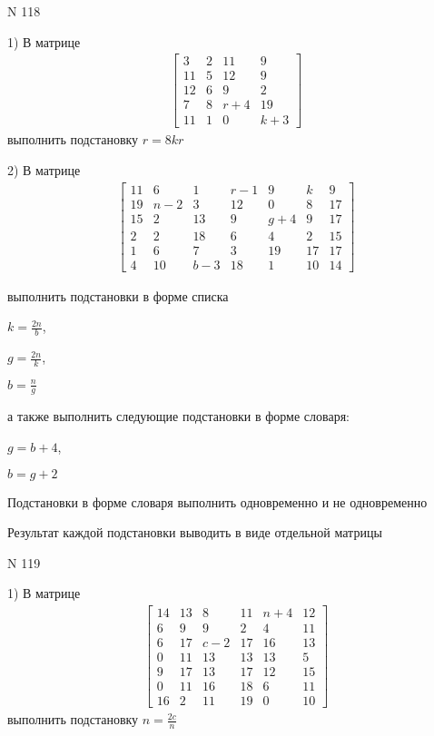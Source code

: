 \documentclass[11pt]{report}
\begin{document}
\newpage
N 118


    1) В матрице
\begin{align*}
\left[\begin{matrix}3 & 2 & 11 & 9\\11 & 5 & 12 & 9\\12 & 6 & 9 & 2\\7 & 8 & r + 4 & 19\\11 & 1 & 0 & k + 3\end{matrix}\right]
\end{align*}
выполнить подстановку $r=8 k r$


    2) В матрице
\begin{align*}
\left[\begin{matrix}11 & 6 & 1 & r - 1 & 9 & k & 9\\19 & n - 2 & 3 & 12 & 0 & 8 & 17\\15 & 2 & 13 & 9 & g + 4 & 9 & 17\\2 & 2 & 18 & 6 & 4 & 2 & 15\\1 & 6 & 7 & 3 & 19 & 17 & 17\\4 & 10 & b - 3 & 18 & 1 & 10 & 14\end{matrix}\right]
\end{align*}

выполнить подстановки в форме списка

$k=\frac{2 n}{b}$,

$g=\frac{2 n}{k}$,

$b=\frac{n}{g}$

а также выполнить следующие подстановки в форме словаря:

$g=b + 4$,

$b=g + 2$


    Подстановки в форме словаря выполнить одновременно и не одновременно


    Результат каждой подстановки выводить в виде отдельной матрицы

\newpage
N 119


    1) В матрице
\begin{align*}
\left[\begin{matrix}14 & 13 & 8 & 11 & n + 4 & 12\\6 & 9 & 9 & 2 & 4 & 11\\6 & 17 & c - 2 & 17 & 16 & 13\\0 & 11 & 13 & 13 & 13 & 5\\9 & 17 & 13 & 17 & 12 & 15\\0 & 11 & 16 & 18 & 6 & 11\\16 & 2 & 11 & 19 & 0 & 10\end{matrix}\right]
\end{align*}
выполнить подстановку $n=\frac{2 c}{n}$
\end{document}
